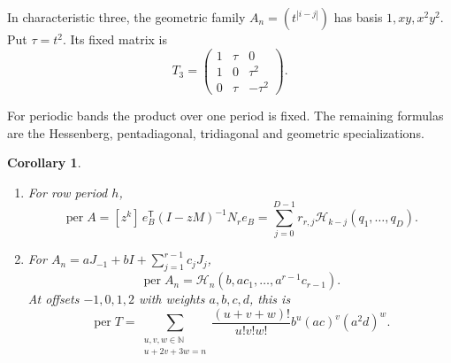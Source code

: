 \documentclass[11pt,reqno]{amsart}
\newtheorem{corollary}[theorem]{Corollary}
\theoremstyle{remark}
\numberwithin{equation}{section}
\newcommand{\per}{\operatorname{per}}
\newcommand{\N}{\mathbb N}
\newcommand{\cH}{\mathcal H}
\begin{document}
In characteristic three, the geometric family
\(A_n=(t^{|i-j|})\) has basis \(1,xy,x^2y^2\). Put
\(\tau=t^2\). Its fixed matrix is
\begin{equation}\label{eq:positive-geometric-matrix}
 T_3=\begin{pmatrix}
       1&\tau&0\\1&0&\tau^2\\0&\tau&-\tau^2
     \end{pmatrix}.
\end{equation}

For periodic bands the product over one period is fixed.
The remaining formulas are the Hessenberg, pentadiagonal,
tridiagonal and geometric specializations.

\begin{corollary}\label{cor:toeplitz}
\leavevmode
\begin{enumerate}
\item For row period \(h\),
\begin{equation}\label{eq:periodic}
 \per A=[z^k]\,e_B^{\mathsf T}(I-zM)^{-1}N_r e_B
       =\sum_{j=0}^{D-1}r_{r,j}\cH_{k-j}(q_1,\ldots,q_D).
\end{equation}

\item For \(A_n=aJ_{-1}+bI+\sum_{j=1}^{r-1}c_jJ_j\),
\begin{equation}\label{eq:hessenberg}
 \per A_n=\cH_n(b,ac_1,\ldots,a^{r-1}c_{r-1}).
\end{equation}
At offsets \(-1,0,1,2\) with weights \(a,b,c,d\), this is
\begin{equation}\label{eq:four-open-expanded}
 \boxed{\displaystyle
 \per T=\sum_{\substack{u,v,w\in\N\\u+2v+3w=n}}\frac{(u+v+w)!}{u!v!w!}
          b^u(ac)^v(a^2d)^w.}
\end{equation}


\end{enumerate}
\end{corollary}
\end{document}
